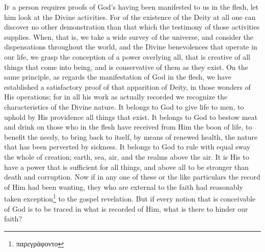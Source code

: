 \textsc{If} a person requires proofs of God’s having been manifested to us in the flesh, let him look at the Divine activities. For of the existence of the Deity at all one can discover no other demonstration than that which the testimony of those activities supplies. When, that is, we take a wide survey of the universe, and consider the dispensations throughout the world, and the Divine benevolences that operate in our life, we grasp the conception of a power overlying all, that is creative of all things that come into being, and is conservative of them as they exist. On the same principle, as regards the manifestation of God in the flesh, we have established a satisfactory proof of that apparition of Deity, in those wonders of His operations; for in all his work as actually recorded we recognize the characteristics of the Divine nature. It belongs to God to give life to men, to uphold by His providence all things that exist. It belongs to God to bestow meat and drink on those who in the flesh have received from Him the boon of life, to benefit the needy, to bring back to itself, by means of renewed health, the nature that has been perverted by sickness. It belongs to God to rule with equal sway the whole of creation; earth, sea, air, and the realms above the air. It is His to have a power that is sufficient for all things, and above all to be stronger than death and corruption. Now if in any one of these or the like particulars the record of Him had been wanting, they who are external to the faith had reasonably taken exception\footnote{\textgreek{παρεγράφοντο}} to the gospel revelation. But if every notion that is conceivable of God is to be traced in what is recorded of Him, what is there to hinder our faith?


